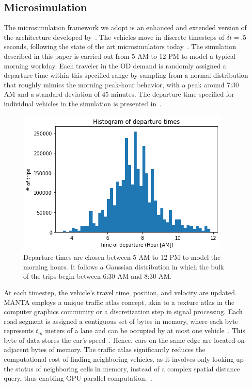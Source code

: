 \documentclass[final]{IEEEtran}
\begin{document}
\subsection{Microsimulation}

The microsimulation framework we adopt is an enhanced and extended version of the architecture developed by~\cite{garcia-doradoDesigningLargescaleInteractive2014}. The vehicles move in discrete timesteps of $\delta t = .5$ seconds, following the state of the art microsimulators today~\cite{dowlingTrafficAnalysisToolbox2004}. The simulation described in this paper is carried out from 5 AM to 12 PM to model a typical morning workday. Each traveler in the OD demand is randomly assigned a departure time within this specified range by sampling from a normal distribution that roughly mimics the morning peak-hour behavior, with a peak around 7:30 AM and a standard deviation of 45 minutes. The departure time specified for individual vehicles in the simulation is presented in~.

\begin{figure}
    \centering
    \includegraphics[width=.45\textwidth]{figs/departure_times.png}
    \caption{Departure times are chosen between 5 AM to 12 PM to model the morning hours. It follows a Gaussian distribution in which the bulk of the trips begin between 6:30 AM and 8:30 AM.}
    \label{fig:dep_times}
\end{figure}

At each timestep, the vehicle's travel time, position, and velocity are updated. MANTA employs a unique traffic atlas concept, akin to a texture atlas in the computer graphics community or a discretization step in signal processing. Each road segment is assigned a contiguous set of bytes in memory, where each byte represents $t_m$ meters of a lane and can be occupied by at most one vehicle~\cite{garcia-doradoDesigningLargescaleInteractive2014}. This byte of data stores the car's speed~\cite{garcia-doradoDesigningLargescaleInteractive2014}. Hence, cars on the same edge are located on adjacent bytes of memory. The traffic atlas significantly reduces the computational cost of finding neighboring vehicles, as it involves only looking up the status of neighboring cells in memory, instead of a complex spatial distance query, thus enabling GPU parallel computation.~\cite{garcia-doradoDesigningLargescaleInteractive2014}. 
\end{document}
